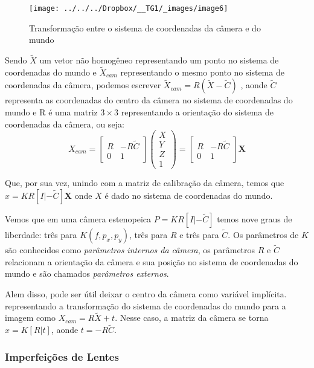 \documentclass[ecp,tc]{iiufrgs}
\begin{document}
\begin{figure}
	\centering
	\caption{Transformação entre o sistema de coordenadas da câmera e do mundo}
	\texttt{[image: ../../../Dropbox/\_\_TG1/\_images/image6]}
	\label{fig:image6}
\end{figure}

Sendo $ \widetilde{X} $ um vetor não homogêneo representando um ponto no sistema de coordenadas do mundo e $ \widetilde{X}_{cam} $ representando o mesmo ponto no sistema de coordenadas da câmera, podemos escrever $ \widetilde{X}_{cam} = R(\widetilde{X} - \widetilde{C}) $ , aonde $ \widetilde{C} $ representa as coordenadas do centro da câmera no sistema de coordenadas do mundo e R é uma matriz $ 3 \times 3 $ representando a orientação do sistema de coordenadas da câmera, ou seja:
\[ X_{cam} =
\begin{bmatrix} R & -R\widetilde{C} \\ 
0 & 1 \end{bmatrix}
\begin{pmatrix} X \\ Y \\ Z \\ 1 \end{pmatrix} =
\begin{bmatrix} R & -R\widetilde{C} \\ 
0 & 1 \end{bmatrix}
\textbf{X}  \]

Que, por sua vez, unindo com a matriz de calibração da câmera, temos que $ x = KR[I|-\widetilde{C}]\textbf{X} $ onde $ X $ é dado no sistema de coordenadas do mundo.

Vemos que em uma câmera estenopeica $ P = KR[I|-\widetilde{C}] $ temos nove graus de liberdade: três para $ K(f, p_x, p_y) $, três para $ R $ e três para $ \widetilde{C} $. Os parâmetros de $K$ são conhecidos como \textit{parâmetros internos da câmera}, os
parâmetros $R$ e $\widetilde{C}$ relacionam a orientação da câmera e sua posição no sistema de coordenadas do mundo e são chamados \textit{parâmetros externos}.

Alem disso, pode ser útil deixar o centro da câmera como variável implícita. representando a transformação do sistema de coordenadas do mundo para a imagem como $ X_{cam} = R\widetilde{X} + t $. Nesse caso, a matriz da câmera se torna $ x = K[R|t] $, aonde $ t = -R\widetilde{C} $.

\subsubsection{Imperfeições de Lentes}
\end{document}
